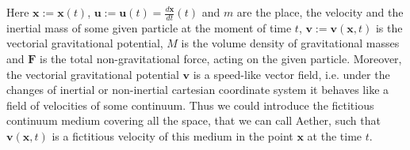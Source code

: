 \documentclass{article}
\theoremstyle{definition}
\theoremstyle{remark}
\renewcommand{\vec}[1]{\mathbf{#1}}
\begin{document}
%
%
%
Here $\vec x:=\vec x(t)$, $\vec u:=\vec u(t)=\frac{d\vec x}{dt}(t)$
and $m$ are the place, the velocity and the inertial mass of some
given particle at the moment of time $t$, $\vec v:=\vec v(\vec x,t)$
is the vectorial gravitational potential, $M$ is the volume density
of gravitational masses and $\vec F$ is the total non-gravitational
force, acting on the given particle. Moreover, the vectorial
gravitational potential $\vec v$ is a speed-like vector field, i.e.
under the changes of inertial or non-inertial cartesian coordinate
system it behaves like a field of velocities of some continuum. Thus
we could introduce the fictitious continuum medium covering all the
space, that we can call Aether, such that $\vec v(\vec x,t)$ is a
fictitious velocity of this medium in the point $\vec x$ at the time
$t$.
\end{document}
